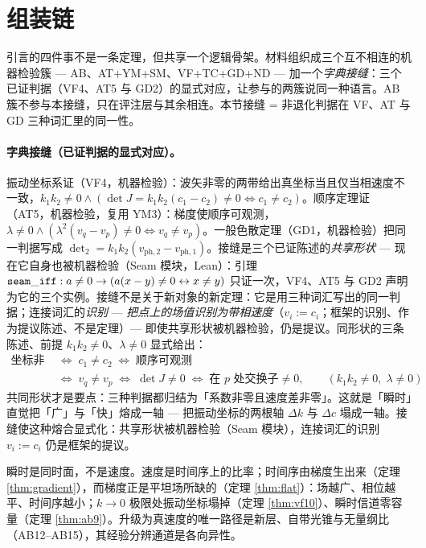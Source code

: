 \documentclass[aps,prd,preprint,superscriptaddress,amsmath,amssymb]{revtex4-2}
\begin{document}
\section{组装链}
\label{sec:chain}

引言的四件事不是一条定理，但共享一个逻辑骨架。材料组织成三个互不相连的机器检验簇 --- {AB}、{AT+YM+SM}、{VF+TC+GD+ND} --- 加一个\emph{字典接缝}：三个已证判据（VF4、AT5 与 GD2）的显式对应，让参与的两簇说同一种语言。{AB} 簇不参与本接缝，只在评注层与其余相连。本节接缝 = 非退化判据在 VF、AT 与 GD 三种词汇里的同一性。

\paragraph{字典接缝（已证判据的显式对应）。}
振动坐标系证（VF4，机器检验）：波矢非零的两带给出真坐标当且仅当相速度不一致，$k_1k_2\ne0 \wedge (\det J=k_1k_2(c_1-c_2)\ne0 \Leftrightarrow c_1\ne c_2)$。顺序定理证（AT5，机器检验，复用 YM3）：梯度使顺序可观测，$\lambda\ne0 \wedge (\lambda^2(v_q-v_p)\ne0 \Leftrightarrow v_q\ne v_p)$。一般色散定理（GD1，机器检验）把同一判据写成 $\det_2=k_1k_2(v_{{\mathrm{ph}},2}-v_{{\mathrm{ph}},1})$。接缝是三个已证陈述的\emph{共享形状} --- 现在它自身也被机器检验（Seam 模块，Lean）：引理 ${\tt seam\_iff}: a\ne0 \rightarrow (a(x-y)\ne0 \leftrightarrow x\ne y)$ 只证一次，VF4、AT5 与 GD2 声明为它的三个实例。接缝不是关于新对象的新定理：它是用三种词汇写出的同一判据；连接词汇的\emph{识别} --- \emph{把点上的场值识别为带相速度}（$v_i:=c_i$；框架的识别、作为提议陈述、不是定理）--- 即使共享形状被机器检验，仍是提议。同形状的三条陈述、前提 $k_1k_2\ne0$、$\lambda\ne0$ 显式给出：
\begin{equation}
\begin{aligned}
\text{坐标非退化} &\;\Leftrightarrow\; c_1\ne c_2
\;\Leftrightarrow\; \text{顺序可观测} \\
&\;\Leftrightarrow\; v_q\ne v_p \;\Leftrightarrow\;
\det J\ne0 \;\Leftrightarrow\; \text{在 } p \text{ 处交换子}\ne0 ,
\qquad (k_1k_2\ne0,\; \lambda\ne0)
\end{aligned}
\label{eq:seam}
\end{equation}
共同形状才是要点：三种判据都归结为「系数非零且速度差非零」。这就是「瞬时」直觉把「广」与「快」熔成一轴 --- 把振动坐标的两根轴 $\Delta k$ 与 $\Delta c$ 塌成一轴。接缝使这种熔合显式化：共享形状被机器检验（Seam 模块），连接词汇的识别 $v_i:=c_i$ 仍是框架的提议。

瞬时是同时面，不是速度。速度是时间序上的比率；时间序由梯度生出来（定理 \ref{thm:gradient}），而梯度正是平坦场所缺的（定理 \ref{thm:flat}）：场越广、相位越平、时间序越小；$k\to0$ 极限处振动坐标塌掉（定理 \ref{thm:vf10}）、瞬时信道零容量（定理 \ref{thm:ab9}）。升级为真速度的唯一路径是新层、自带光锥与无量纲比（AB12--AB15），其经验分辨通道是各向异性。
\end{document}
